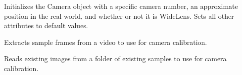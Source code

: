 \documentclass[letterpaper,10pt,english]{sphinxmanual}
\begin{document}
\begin{fulllineitems}
\begin{fulllineitems}
\begin{quote}
\begin{description}
\end{description}\end{quote}

\end{fulllineitems}


\begin{fulllineitems}
\label{\detokenize{CameraUtils:CameraUtils.Camera.__init__}}
\pysigstartsignatures
{}
\pysigstopsignatures
\sphinxAtStartPar
Initializes the Camera object with a specific camera number, an approximate position in the real world,
and whether or not it is WideLens. Sets all other attributes to default values.

\end{fulllineitems}


\begin{fulllineitems}
\label{\detokenize{CameraUtils:CameraUtils.Camera.GetSampleFrames}}
\pysigstartsignatures
{}
\pysigstopsignatures
\sphinxAtStartPar
Extracts sample frames from a video to use for camera calibration.

\end{fulllineitems}


\begin{fulllineitems}
\label{\detokenize{CameraUtils:CameraUtils.Camera.GetCornersFromSamples}}
\pysigstartsignatures
{}
\pysigstopsignatures
\sphinxAtStartPar
Reads existing images from a folder of existing samples to use for camera calibration.


\end{fulllineitems}
\end{fulllineitems}
\end{document}
